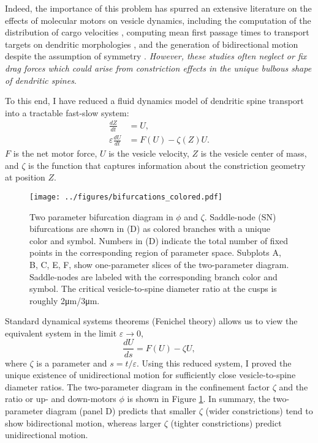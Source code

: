 \documentclass[a4paper,11pt]{article}
\newcommand{\ve}{\varepsilon}
\begin{document}
Indeed, the importance of this problem has spurred an extensive literature on the effects of molecular motors on vesicle dynamics, including the computation of the distribution of cargo velocities \cite{kunwar2011mechanical}, computing mean first passage times to transport targets on dendritic morphologies \cite{bressloff2013metastability}, and the generation of bidirectional motion despite the assumption of symmetry \cite{portet2019deciphering}. \textit{However, these studies often neglect or fix drag forces which could arise from constriction effects in the unique bulbous shape of dendritic spines}.

To this end, I have reduced a fluid dynamics model of dendritic spine transport into a tractable fast-slow system:
\begin{equation}\label{eq:fs1}
\begin{split}
\frac{dZ}{dt} &= U,\\
\ve\frac{dU}{dt} &= F(U) - \zeta(Z) U.
\end{split}
\end{equation}
$F$ is the net motor force, $U$ is the vesicle velocity, $Z$ is the vesicle center of mass, and $\zeta$ is the function that captures information about the constriction geometry at position $Z$.

\begin{figure}[ht!]
	\centering
	\texttt{[image: ../figures/bifurcations\_colored.pdf]}
	\caption{Two parameter bifurcation diagram in $\phi$ and $\zeta$. Saddle-node (SN) bifurcations are shown in (D) as colored branches with a unique color and symbol. Numbers in (D) indicate the total number of fixed points in the corresponding region of parameter space. Subplots A, B, C, E, F, show one-parameter slices of the two-parameter diagram. Saddle-nodes are labeled with the corresponding branch color and symbol. The critical vesicle-to-spine diameter ratio at the cusps is roughly 2\si{.\um}/3\si{.\um}.}\label{fig:2par}
\end{figure}

Standard dynamical systems theorems (Fenichel theory) allows us to view the equivalent system in the limit $\ve\rightarrow 0$,
\begin{equation*}
\frac{dU}{ds} = F(U) - \zeta U,
\end{equation*}
where $\zeta$ is a parameter and  $s=t/\ve$. Using this reduced system, I proved the unique existence of unidirectional motion for sufficiently close vesicle-to-spine diameter ratios. The two-parameter diagram in the confinement factor $\zeta$ and the ratio or up- and down-motors $\phi$ is shown in Figure \ref{fig:2par}. In summary, the two-parameter diagram (panel D) predicts that smaller $\zeta$ (wider constrictions) tend to show bidirectional motion, whereas larger $\zeta$ (tighter constrictions) predict unidirectional motion.
\end{document}
